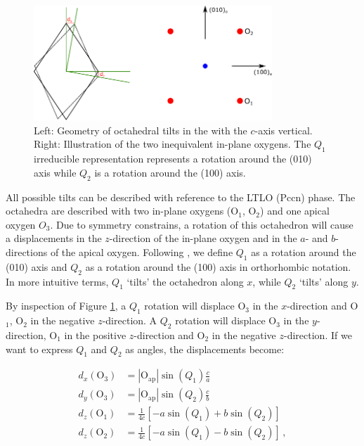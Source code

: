 \begin{figure}
    \centering
    \includegraphics[width=0.8\textwidth]{fig/simulation/tilt.pdf}
    \caption[Geometry of octahedral tilts]{Left: Geometry of octahedral tilts in the with the $c$-axis vertical. Right: Illustration of the two inequivalent in-plane oxygens. The $Q_1$ irreducible representation represents a rotation around the (010) axis while $Q_2$ is a rotation around the (100) axis.}
    \label{fig:tilt}
\end{figure}

All possible tilts can be described with reference to the LTLO (Pccn) phase. The octahedra are described with two in-plane oxygens (O$_1$, O$_2$) and one apical oxygen $O_3$. Due to symmetry constrains, a rotation of this octahedron will cause a displacements in the $z$-direction of the in-plane oxygen and in the $a$- and $b$-directions of the apical oxygen. Following \cite{Axe1989}, we define $Q_1$ as a rotation around the (010) axis and $Q_2$ as a rotation around the (100) axis in orthorhombic notation. In more intuitive terms, $Q_1$ `tilts' the octahedron along $x$, while $Q_2$ `tilts' along $y$.

By inspection of Figure \ref{fig:tilt}, a $Q_1$ rotation will displace O$_3$ in the $x$-direction and O$_1$, O$_2$ in the negative $z$-direction. A $Q_2$ rotation will displace O$_3$ in the $y$-direction, O$_1$ in the positive $z$-direction and O$_2$ in the negative $z$-direction. If we want to express $Q_1$ and $Q_2$ as angles, the displacements become:


\begin{align*}
d_x(\text{O}_3) &= | \text{O}_\text{ap} | \sin (Q_1) \frac{c}{a} \\
d_y(\text{O}_3) &= | \text{O}_\text{ap} | \sin (Q_2) \frac{c}{b} \\
d_z(\text{O}_1) &= \frac{1}{4c} \left[ - a \sin (Q_1) + b \sin (Q_2) \right] \\
d_z(\text{O}_2) &= \frac{1}{4c} \left[ - a \sin (Q_1) - b \sin (Q_2) \right] \, ,
\end{align*}

